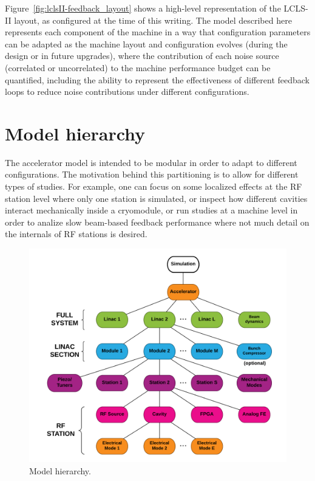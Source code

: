 \documentclass[a4paper,12pt]{article}
\begin{document}
Figure~\ref{fig:lclsII-feedback_layout} shows a high-level representation of the LCLS-II layout, as configured at the time of this writing. The model described here represents each component of the machine in a way that configuration parameters can be adapted as the machine layout and configuration evolves (during the design or in future upgrades), where the contribution of each noise source (correlated or uncorrelated) to the machine performance budget can be quantified, including the ability to represent the effectiveness of different feedback loops to reduce noise contributions under different configurations. 

\section{Model hierarchy}

The accelerator model is intended to be modular in order to adapt to different configurations. The motivation behind this partitioning is to allow for different types of studies. For example, one can focus on some localized effects at the RF station level where only one station is simulated, or inspect how different cavities interact mechanically inside a cryomodule, or run studies at a machine level in order to analize slow beam-based feedback performance where not much detail on the internals of RF stations is desired.

\begin{figure}
\centering
\includegraphics[scale=0.2]{../figures/Model_hierarchy.png}
\caption{Model hierarchy.}
\label{fig:model_hierarchy}
\end{figure}
\end{document}
